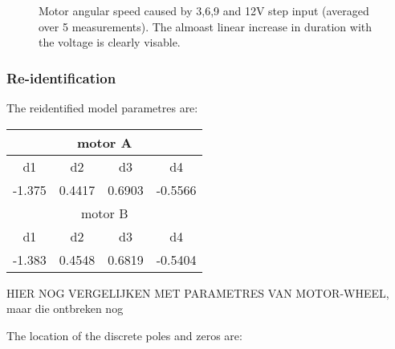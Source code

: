 \documentclass[a4paper]{article}
\newcommand{\newpar}{\vspace{.3cm}\noindent}
\begin{document}

\begin{figure}[H]
    \caption{Motor angular speed caused by 3,6,9 and 12V step input (averaged over 5 measurements). The almoast linear increase in duration with the voltage is clearly visable.}
    \label{fig:_mean_v}
\end{figure}

\subsubsection{Re-identification}
The reidentified model parametres are:

\begin{center}
    \begin{tabular}{ |c|c|c|c|}
    \hline
    \multicolumn{4}{|c|}{motor A} \\
    \hline
     d1 & d2 & d3 & d4 \\
    \hline
    -1.375 & 0.4417 & 0.6903 & -0.5566 \\
    \hline
    \multicolumn{4}{|c|}{motor B} \\
    \hline
     d1 & d2 & d3 & d4 \\
    \hline
    -1.383 & 0.4548 & 0.6819 & -0.5404 \\
    \hline
    \end{tabular}  
    \label{tab:location_Sys_31z_f}
\end{center}

\newpar
HIER NOG VERGELIJKEN MET PARAMETRES VAN MOTOR-WHEEL, maar die ontbreken nog

\newpar
The location of the discrete poles and zeros are:
\end{document}
